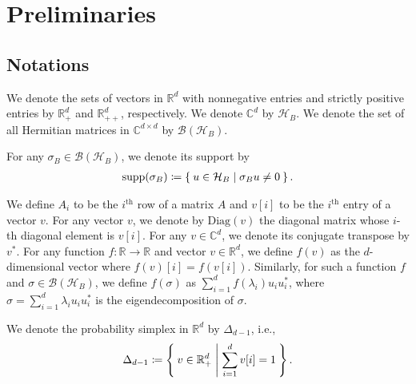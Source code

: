 \documentclass{article}
\DeclareMathOperator{\supp}{supp}
\begin{document}
\section{Preliminaries}
\label{sec:problem}
\subsection{Notations}
We denote the sets of vectors in $\mathbb{R}^d$ with nonnegative entries and
strictly 
positive entries by $\mathbb{R}_{+}^d$ and $\mathbb{R}_{++}^d$, respectively.
We denote $\mathbb{C}^d$ by $\mathcal{H}_B$. 
We denote the set of all Hermitian matrices in $\mathbb{C}^{d\times d}$ by $\mathcal{B}\left(\mathcal{H}_B\right)$.

For any $\sigma_B \in \mathcal{B}(\mathcal{H}_B)$, we denote its support by 
\begin{align}
    \supp(\sigma_B)\coloneqq \Set{ u \in \mathcal{H}_B \mid \sigma_B u \neq 0 }.
\end{align}

We define $A_i$ to be the $i^{\text{th}}$ row of a matrix $A$ and $v[i]$ to be the $i^{\text{th}}$ entry of a vector $v$. 
For any vector $v$, we denote by $\mathrm{Diag}(v)$ the diagonal matrix whose $i$-th diagonal element is $v[i]$. 
For any $v\in\mathbb{C}^d$, we denote its conjugate transpose by $v^*$.
For any function \( f: \mathbb{R} \to \mathbb{R} \) and 
vector \( v \in \mathbb{R}^d \), we define \( f(v) \) 
as 
the 
\( d \)-dimensional vector where \( f(v)[i] = f(v[i]) \). 
Similarly, for such a function \( f \) and \( \sigma \in \mathcal{B}(\mathcal{H}_B) \), we define \( f(\sigma) \) as \( \sum_{i=1}^d f(\lambda_i)  u_i u_i^* \), where \( \sigma = \sum_{i=1}^d \lambda_i   u_i u_i^* \) is the eigendecomposition of \( \sigma \). 


We denote the probability simplex in $\mathbb{R}^d$ by $\Delta_{d-1}$, i.e.,
\begin{align}
    \Delta_{d-1}\coloneqq %
    \Set{ v \in \mathbb{R}_{+}^d | \sum_{i=1}^d v[i] = 1 }.
\end{align}
\end{document}
